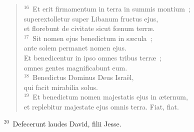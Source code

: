 \begin{flushleft}
\begin{verse}
${}^{16}$~Et erit firmamentum in terra in summis montium~;\\ superextolletur super Libanum fructus ejus,\\ et florebunt de civitate sicut fœnum terr\ae .\\
${}^{17}$~Sit nomen ejus benedictum in s\ae cula~;\\ ante solem permanet nomen ejus.\\ Et benedicentur in ipso omnes tribus terr\ae~;\\ omnes gentes magnificabunt eum.\\
${}^{18}$~Benedictus Dominus Deus Isra\"el,\\ qui facit mirabilia solus.\\
${}^{19}$~Et benedictum nomen majestatis ejus in \ae ternum,\\ et replebitur majestate ejus omnis terra. Fiat, fiat.\end{verse}\end{flushleft}


${}^{20}$~Defecerunt laudes David, filii Jesse.

